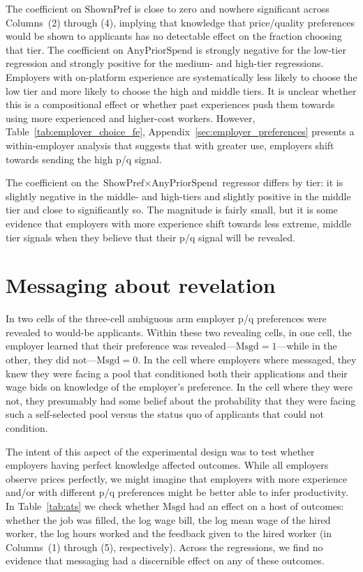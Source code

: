 \documentclass[prodmode,acmec]{ec-acmsmall}
\newcommand{\important}[1]{#1}
\begin{document}
The coefficient on $\mbox{ShownPref}$ is close to zero and nowhere significant across Columns~(2) through (4), implying that \important{knowledge that price/quality preferences would be shown to applicants has no detectable effect on the fraction choosing that tier.}
The coefficient on $\mbox{AnyPriorSpend}$ is strongly negative for the low-tier regression and strongly positive for the medium- and high-tier regressions. 
\important{Employers with on-platform experience are systematically less likely to choose the low tier and more likely to choose the high and middle tiers.}
It is unclear whether this is a compositional effect or whether past experiences push them towards using more experienced and higher-cost workers.
However, Table~\ref{tab:employer_choice_fe}, Appendix~\ref{sec:employer_preferences} presents a within-employer analysis that suggests that with greater use, employers shift towards sending the high p/q signal. 

The coefficient on the $\mbox{ShowPref} \times \mbox{AnyPriorSpend}$ regressor differs by tier:
it is slightly negative in the middle- and high-tiers and slightly positive in the middle tier and close to significantly so.
The magnitude is fairly small, but it is some evidence that \important{employers with more experience shift towards less extreme, middle tier signals when they believe that their p/q signal will be revealed.}


\section{Messaging about revelation}
\label{sec:messaging} 
In two cells of the three-cell ambiguous arm employer p/q preferences were revealed to would-be applicants.
Within these two revealing cells, in one cell, the employer learned that their preference was revealed---$\mbox{Msgd} = 1$---while in the other, they did not---$\mbox{Msgd} = 0$.
In the cell where employers where messaged, they knew they were facing a pool that conditioned both their applications and their wage bids on knowledge of the employer's preference.
In the cell where they were not, they presumably had some belief about the probability that they were facing such a self-selected pool versus the status quo of applicants that could not condition.   

The intent of this aspect of the experimental design was to test whether employers having perfect knowledge affected outcomes.
While all employers observe prices perfectly, we might imagine that employers with more experience and/or with different p/q preferences might be better able to infer productivity.
In Table~\ref{tab:ats} we check whether $\mbox{Msgd}$ had an effect on a host of outcomes:
whether the job was filled, the log wage bill, the log mean wage of the hired worker, the log hours worked and the feedback given to the hired worker (in Columns~(1) through (5), respectively).
Across the regressions, we find no evidence that messaging had a discernible effect on any of these outcomes.  
\end{document}
